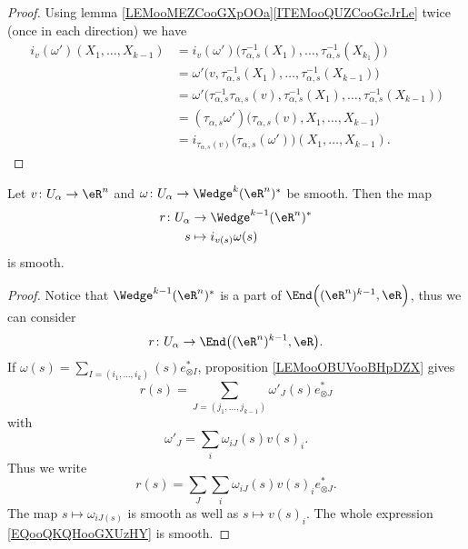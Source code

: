 \begin{proof}
	Using lemma \ref{LEMooMEZCooGXpOOa}\ref{ITEMooQUZCooGcJrLe} twice (once in each direction) we have
	\begin{subequations}
		\begin{align}
			i_v(\omega')(X_1,\ldots,X_{k-1}) & =i_v(\omega')\big( \tau_{\alpha,s}^{-1}(X_1),\ldots,\tau_{\alpha,s}^{-1}(X_{k_1}) \big)                                   \\
			                                 & =\omega'\big( v,\tau_{\alpha,s}^{-1}(X_1),\ldots,\tau_{\alpha,s}^{-1}(X_{k-1}) \big)                                      \\
			                                 & =\omega'\big( \tau_{\alpha,s}^{-1}\tau_{\alpha,s}(v),\tau_{\alpha,s}^{-1}(X_1),\ldots,\tau_{\alpha,s}^{-1}(X_{k-1}) \big) \\
			                                 & =(\tau_{\alpha,s}\omega')\big( \tau_{\alpha,s}(v),X_1,\ldots,X_{k-1} \big)                                                \\
			                                 & =i_{\tau_{\alpha,s}(v)}\big( \tau_{\alpha,s}(\omega') \big)(X_1,\ldots,X_{k-1}).
		\end{align}
	\end{subequations}
\end{proof}

\begin{lemma}		\label{LEMooEKYDooKkgZJB}
	Let \(v \colon U_{\alpha}\to \eR^n  \) and \(\omega \colon U_{\alpha}\to \Wedge^k(\eR^n)^*  \) be smooth. Then the map
	\begin{equation}
		\begin{aligned}
			r\colon U_{\alpha} & \to \Wedge^{k-1}(\eR^n)^* \\
			s                  & \mapsto i_{v(s)}\omega(s)
		\end{aligned}
	\end{equation}
	is smooth.
\end{lemma}

\begin{proof}
	Notice that \( \Wedge^{k-1}(\eR^n)^*\) is a part of \( \End\Big( (\eR^n)^{k-1},\eR \Big)\), thus we can consider
	\begin{equation}
		r \colon U_{\alpha}\to \End\big( (\eR^n)^{k-1},\eR \big).
	\end{equation}
	If \( \omega(s)=\sum_{I=(i_1,\ldots,i_k)}(s)e^*_{\otimes I}\), proposition \ref{LEMooOBUVooBHpDZX} gives
	\begin{equation}
		r(s)=\sum_{J=(j_1,\ldots,j_{k-1})}\omega'_J(s)e^*_{\otimes J}
	\end{equation}
	with
	\begin{equation}
		\omega'_J=\sum_i\omega_{iJ}(s)v(s)_i.
	\end{equation}
	Thus we write
	\begin{equation}		\label{EQooQKQHooGXUzHY}
		r(s)=\sum_J\sum_i\omega_{iJ}(s)v(s)_ie^*_{\otimes J}.
	\end{equation}
	The map \( s\mapsto \omega_{iJ(s)}\) is smooth as well as \( s\mapsto v(s)_i\). The whole expression \eqref{EQooQKQHooGXUzHY} is smooth.
\end{proof}

